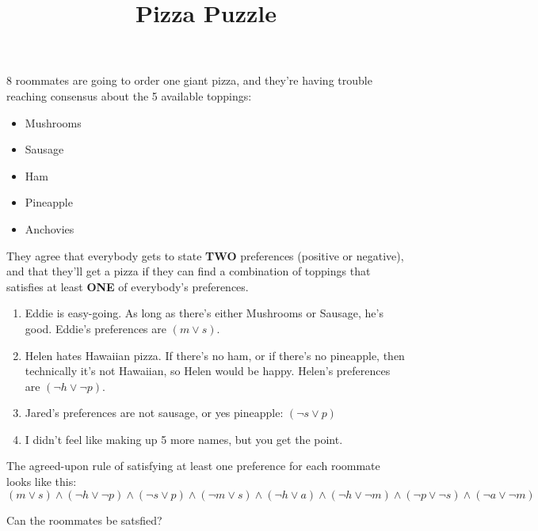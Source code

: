 \documentclass[12pt]{article}
\begin{document}
\title{Pizza Puzzle}

8 roommates are going to order one giant pizza, and they're having trouble
reaching consensus about the 5 available toppings:
\begin{itemize}
\item Mushrooms
\item Sausage
\item Ham
\item Pineapple
\item Anchovies
\end{itemize}

They agree that everybody gets to state {\bf TWO} preferences (positive or
negative), and that they'll get a pizza if they can find a combination of
toppings that satisfies at least {\bf ONE} of everybody's preferences.

\begin{enumerate}
\item Eddie is easy-going. As long as there's either Mushrooms or Sausage, he's
  good. Eddie's preferences are $(m \lor s)$.
\item Helen {\sc hates} Hawaiian pizza. If there's no ham, or if there's no
  pineapple, then technically it's not Hawaiian, so Helen would be
  happy. Helen's preferences are $(\neg h \lor \neg p)$.
\item Jared's preferences are not sausage, or yes pineapple: $(\neg s \lor p)$
\item I didn't feel like making up 5 more names, but you get the point.
\end{enumerate}

The agreed-upon rule of satisfying at least one preference for each roommate looks like this:
$$(m \lor s) \land
(\neg h \lor \neg p) \land
(\neg s \lor p) \land
(\neg m \lor s) \land
(\neg h \lor a) \land
(\neg h \lor \neg m) \land
(\neg p \lor \neg s) \land
(\neg a \lor \neg m)$$

Can the roommates be satsfied?
\end{document}
